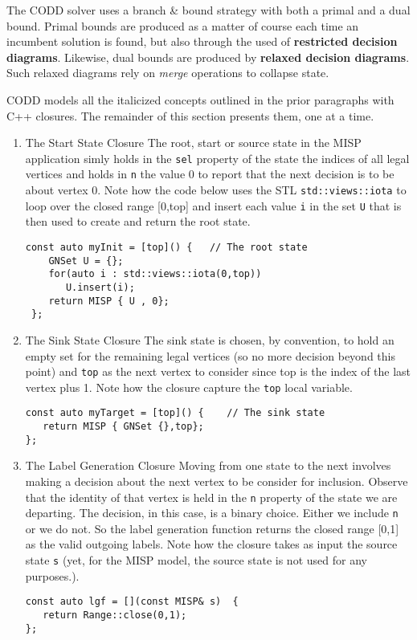 \documentclass[11pt]{article}
\begin{document}
The CODD solver uses a branch \& bound strategy with both a primal and a dual bound. Primal bounds are produced as a matter of course each time an incumbent solution is found, but also through  the used of \textbf{restricted decision diagrams}. Likewise, dual bounds are produced by \textbf{relaxed decision diagrams}. Such relaxed diagrams rely on
\emph{merge}  operations to collapse state.

CODD models all the italicized concepts outlined in the prior paragraphs with C++ closures. The remainder of this section presents them, one at a time.

\begin{enumerate}
\item The Start State Closure
\label{sec:orgd0c7cb6}
The root, start or source state in the MISP application simly holds in the \texttt{sel} property of the state the indices of all legal vertices and holds in \texttt{n} the value 0 to report that the next decision is to be about vertex 0.  Note how the code below
uses the STL \texttt{std::views::iota} to loop over the closed range [0,top] and insert each value \texttt{i} in the set \texttt{U}  that is then used to create and return the root state.

\begin{verbatim}
const auto myInit = [top]() {   // The root state
    GNSet U = {}; 
    for(auto i : std::views::iota(0,top))
       U.insert(i);
    return MISP { U , 0};
 };
\end{verbatim}

\item The Sink State Closure
\label{sec:org5f5df4f}
The sink state is chosen, by convention, to hold an empty set for the remaining legal vertices (so no more decision beyond this point) and \texttt{top} as the next vertex to consider since top is the index of the last vertex plus 1. Note how the closure capture the \texttt{top} local variable.
\begin{verbatim}
const auto myTarget = [top]() {    // The sink state
   return MISP { GNSet {},top};
};
\end{verbatim}

\item The Label Generation Closure
\label{sec:org7ebb796}
Moving from one state to the next involves making a decision about the next vertex to be consider for inclusion. Observe that the identity of that vertex is held in the \texttt{n} property of the state we are departing. The decision, in this case, is a binary choice. Either we include \texttt{n} or we do not. So the label generation function
returns the closed range [0,1] as the valid outgoing labels. Note how the closure takes as input the source state \texttt{s} (yet, for the MISP model, the source state is not used for any purposes.).
\begin{verbatim}
const auto lgf = [](const MISP& s)  {
   return Range::close(0,1);
}; 
\end{verbatim}


\end{enumerate}
\end{document}
